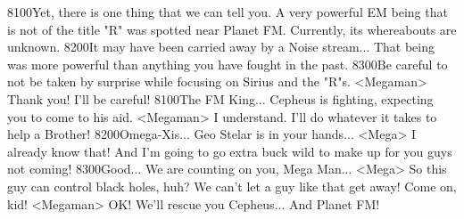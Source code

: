 {81}{00}Yet, there is one thing that we can tell you. 
A very powerful EM being that is not of the title "R" was spotted near Planet FM. 
Currently, its whereabouts are unknown. 
{82}{00}It may have been carried away by a Noise stream... 
That being was more powerful than anything you have fought in the past. 
{83}{00}Be careful to not be taken by surprise while focusing on Sirius and the "R"s. 
<Megaman> Thank you! I'll be careful! 
{81}{00}The FM King... Cepheus is fighting, expecting you to come to his aid. 
<Megaman> I understand. I'll do whatever it takes to help a Brother! 
{82}{00}Omega-Xis... Geo Stelar is in your hands... 
<Mega> I already know that! 
And I'm going to go extra buck wild to make up for you guys not coming! 
{83}{00}Good... We are counting on you, Mega Man... 
<Mega> So this guy can control black holes, huh? 
We can't let a guy like that get away! 
Come on, kid! 
<Megaman> OK! We'll rescue you Cepheus... And Planet FM! 
